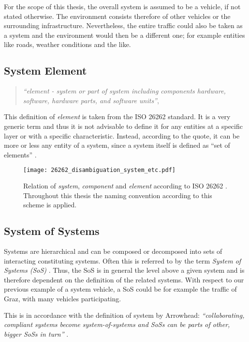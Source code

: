 For the scope of this thesis, the overall system is assumed to be a vehicle, if not stated otherwise. The environment consists therefore of other vehicles or the surrounding infrastructure. Nevertheless, the entire traffic could also be taken as a system and the environment would then be a different one; for example entities like roads, weather conditions and the like.



\subsection{System Element}
\label{sec:system_element}
\begin{quote}
\emph{``element - system or part of system including components hardware, software, hardware parts, and software units''}, \cite{iso26262:1}
\end{quote}
This definition of \emph{element} is taken from the ISO 26262 standard. It is a very generic term and thus it is not advisable to define it for any entities at a specific layer or with a specific characteristic. Instead, according to the quote, it can be more or less any entity of a system, since a system itself is defined as ``set of elements'' \cite{iso26262:1}.

\begin{figure}[ht]
\centering
\texttt{[image: 26262\_disambiguation\_system\_etc.pdf]}

\caption{Relation of \emph{system}, \emph{component} and \emph{element} according to ISO 26262 \cite{iso26262:course1}. Throughout this thesis the naming convention according to this scheme is applied.}
\label{fig:26262_disambiguation}
\end{figure}


\subsection{System of Systems}
Systems are hierarchical and can be composed or decomposed into sets of interacting constituting systems. Often this is referred to by the term \emph{System of Systems (SoS)} \cite[p.7]{genesys}. Thus, the SoS is in general the level above a given system and is therefore dependent on the definition of the related systems. With respect to our previous example of a system vehicle, a SoS could be for example the traffic of Graz, with many vehicles participating.

This is in accordance with the definition of system by Arrowhead: \emph{``collaborating, compliant systems become system-of-systems and SoSs can be parts of other, bigger SoSs in turn''} \cite{arrowhead_inpr}. 

